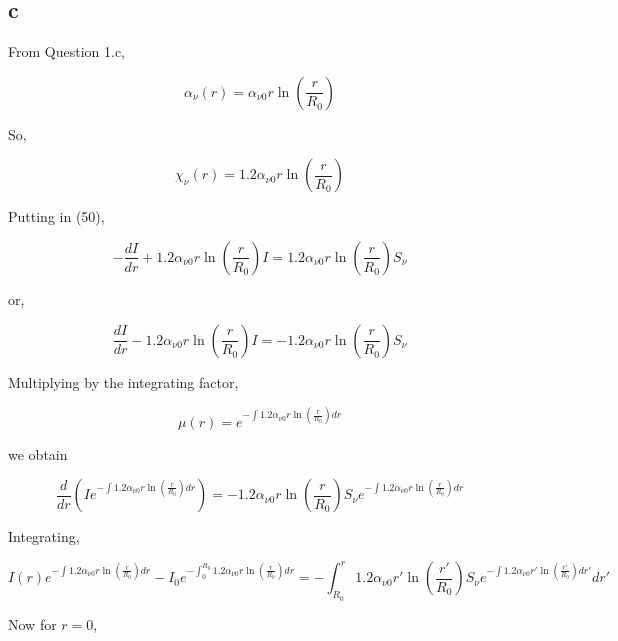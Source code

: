 \documentclass{article}
\begin{document}
\subsection{c}

From Question 1.c,

\begin{equation}
\alpha_\nu(r)=\alpha_{\nu0} r\ln\left(\frac{r}{R_0}\right)
\end{equation}

So,

\begin{equation}
\chi_\nu(r)=1.2\alpha_{\nu0} r\ln\left(\frac{r}{R_0}\right)
\end{equation}

Putting in (50),

\begin{equation}
-\frac{dI}{dr}+1.2\alpha_{\nu0} r\ln\left(\frac{r}{R_0}\right) I
=
1.2\alpha_{\nu0} r\ln\left(\frac{r}{R_0}\right) S_\nu
\end{equation}

or,

\begin{equation}
\frac{dI}{dr}-1.2\alpha_{\nu0} r\ln\left(\frac{r}{R_0}\right) I
=
-1.2\alpha_{\nu0} r\ln\left(\frac{r}{R_0}\right) S_\nu
\end{equation}

Multiplying by the integrating factor,

\begin{equation}
\mu(r)=e^{-\int1.2\alpha_{\nu0} r\ln\left(\frac{r}{R_0}\right) dr}
\end{equation}

we obtain

\begin{equation}
\frac{d}{dr}
\left(
I e^{-\int1.2\alpha_{\nu0} r\ln\left(\frac{r}{R_0}\right) dr}
\right)
=
-1.2\alpha_{\nu0} r\ln\left(\frac{r}{R_0}\right) S_\nu
e^{-\int1.2\alpha_{\nu0} r\ln\left(\frac{r}{R_0}\right) dr}
\end{equation}

Integrating,

\begin{equation}
I(r)e^{-\int1.2\alpha_{\nu0} r\ln\left(\frac{r}{R_0}\right) dr}
-
I_0 e^{-\int_{0}^{R_0}1.2\alpha_{\nu0} r\ln\left(\frac{r}{R_0}\right) dr}
=
-
\int_{R_0}^{r}
1.2\alpha_{\nu0} r'\ln\left(\frac{r'}{R_0}\right) S_\nu
e^{-\int1.2\alpha_{\nu0} r'\ln\left(\frac{r'}{R_0}\right) dr'} dr'
\end{equation}

Now for $r=0$,
\end{document}
